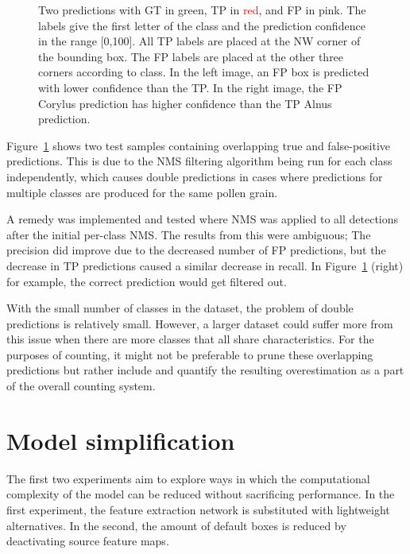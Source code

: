 \begin{figure}[htbp]
\begin{subfigure}[t]{0.4\textwidth}
  \end{subfigure}
  \caption[Predictions showing TP overlapped by FP from different class]{Two predictions with GT in \textcolor{nicegreen}{green}, TP in \textcolor{red}{red}, and FP in \textcolor{nicepink}{pink}.
The labels give the first letter of the class and the prediction confidence in the range [0,100].
All TP labels are placed at the NW corner of the bounding box.
The FP labels are placed at the other three corners according to class.
In the left image, an FP box is predicted with lower confidence than the TP\@.
In the right image, the FP Corylus prediction has higher confidence than the TP Alnus prediction.}\label{fig:results-overlapping-predictions}
\end{figure}

Figure~\ref{fig:results-overlapping-predictions} shows two test samples containing overlapping true and false-positive predictions.
This is due to the NMS filtering algorithm being run for each class independently, which causes double predictions in cases where predictions for multiple classes are produced for the same pollen grain.

A remedy was implemented and tested where NMS was applied to all detections after the initial per-class NMS\@.
The results from this were ambiguous; The precision did improve due to the decreased number of FP predictions, but the decrease in TP predictions caused a similar decrease in recall.
In Figure~\ref{fig:results-overlapping-predictions} (right) for example, the correct prediction would get filtered out.

With the small number of classes in the dataset, the problem of double predictions is relatively small.
However, a larger dataset could suffer more from this issue when there are more classes that all share characteristics.
For the purposes of counting, it might not be preferable to prune these overlapping predictions but rather include and quantify the resulting overestimation as a part of the overall counting system.

\section{Model simplification}\label{sec:results-simplification}
The first two experiments aim to explore ways in which the computational complexity of the model can be reduced without sacrificing performance.
In the first experiment, the feature extraction network is substituted with lightweight alternatives.
In the second, the amount of default boxes is reduced by deactivating source feature maps.

